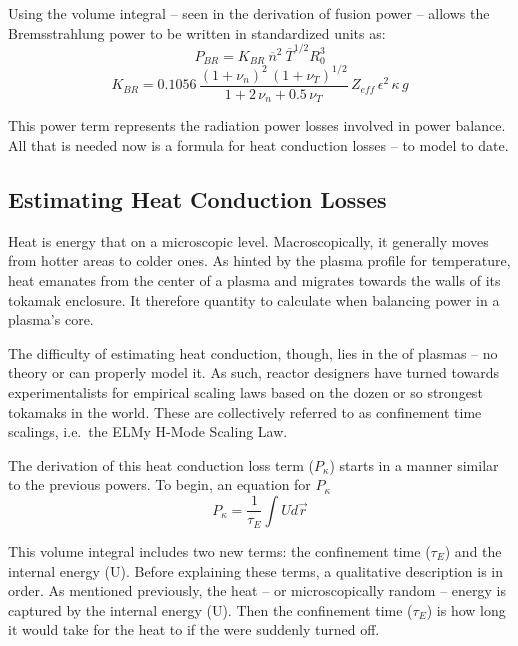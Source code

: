 Using the volume integral -- seen in the derivation of fusion power -- allows the Bremsstrahlung power to be written in standardized units as:
\begin{equation}
	\label{eq:pbr}
	P_{BR} = K_{BR} \ \overline n ^ 2 \ \overline T ^ {1/2} R_0^3 
\end{equation}
\begin{equation}
	K_{BR} = 0.1056 \, \frac{ (1+\nu_n)^2 \, (1+\nu_T)^{1/2} }{1+2 \, \nu_n + 0.5 \, \nu_T} \, Z_{eff} \, \epsilon^2 \, \kappa \, g
\end{equation}

This power term represents the radiation power losses involved in power balance. All that is needed now is a formula for heat conduction losses --  to model to date.

\subsection{Estimating Heat Conduction Losses}

Heat is energy that  on a microscopic level. Macroscopically, it generally moves from hotter areas to colder ones. As hinted by the plasma profile for temperature, heat emanates from the center of a plasma and migrates towards the walls of its tokamak enclosure. It therefore  quantity to calculate when balancing power in a plasma's core.

The difficulty of estimating heat conduction, though, lies in the  of plasmas -- no theory or  can properly model it. As such, reactor designers have turned towards experimentalists for empirical scaling laws based on the dozen or so strongest tokamaks in the world. These are collectively referred to as confinement time scalings, i.e.\ the ELMy H-Mode Scaling Law.

The derivation of this heat conduction loss term ($P_\kappa$) starts in a manner similar to the previous powers. To begin, an equation for $P_\kappa$  
\begin{equation}
	P_\kappa = \frac{1}{\tau_E} \int U d \vec r
\end{equation}

This volume integral includes two new terms: the confinement time ($\tau_E$) and the internal energy (U). Before explaining these terms, a qualitative description is in order. As mentioned previously, the heat -- or microscopically random -- energy is captured by the internal energy (U). Then the confinement time ($\tau_E$) is how long it would take for the heat to  if the  were suddenly turned off.


